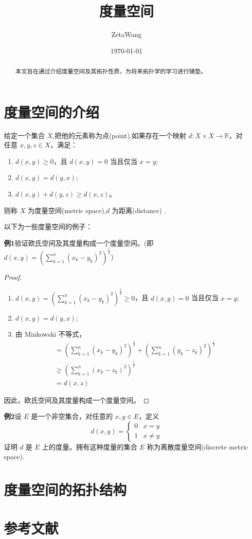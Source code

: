 \documentclass{article}
\title{度量空间}
\author{ZetaWang}
\date{\today}
\begin{document}
\maketitle

\begin{abstract}
本文旨在通过介绍度量空间及其拓扑性质，为将来拓扑学的学习进行铺垫。
\end{abstract}

\tableofcontents %

\section{度量空间的介绍}
给定一个集合 $X$,把他的元素称为点(point),如果存在一个映射 $d:X\times X\rightarrow \mathbb{R}$，对任意 $x,y,z\in X$，满足：
\begin{enumerate}
    \item $d(x,y)\geq 0$，且 $d(x,y) = 0$ 当且仅当 $x=y$;
    \item $d(x,y) = d(y,x)$;
    \item $d(x,y) + d(y,z) \geq d(x,z)$。
\end{enumerate}
则称 $X$ 为度量空间(metric space),$d$ 为距离(distance) .\setlength{\parskip}{1em} %

以下为一些度量空间的例子：\setlength{\parskip}{1em} %

\textbf{例1}验证欧氏空间及其度量构成一个度量空间。(即 $d(x,y) = (\sum_{k=1}^{n}( x_k-y_k)^2)^{\frac{1}{2}}$)
\begin{proof}
    \begin{enumerate}
        \item $d(x,y) = (\sum_{k=1}^{n}( x_k-y_k)^2)^{\frac{1}{2}} \geq 0$，且 $d(x,y) = 0$ 当且仅当 $x=y$;
        \item $d(x,y) = d(y,x) $;
        \item 由 Minkowski 不等式，
        \begin{align*}
            & = (\sum_{k=1}^{n}( x_k-y_k)^2)^\frac{1}{2} + (\sum_{k=1}^{n}( y_k-z_k)^2)^{\frac{1}{2}} \\
            & \geq (\sum_{k=1}^{n}( x_k-z_k)^2)^{\frac{1}{2}} \\
            & = d(x,z)
        \end{align*}
    \end{enumerate}
    因此，欧氏空间及其度量构成一个度量空间。
\end{proof}

\textbf{例2}设 $E$ 是一个非空集合，对任意的 $x,y\in E$，定义
$$d(x,y) = \begin{cases} 0 & x=y \\ 1 & x\neq y \end{cases}$$
证明 $d$ 是 $E$ 上的度量。拥有这种度量的集合 $E$ 称为离散度量空间(discrete metric space).

\section{度量空间的拓扑结构}


\section*{参考文献} %
\end{document}
